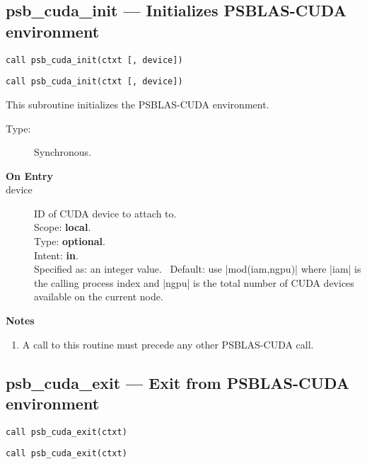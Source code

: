 \subsection*{psb\_cuda\_init --- Initializes PSBLAS-CUDA
  environment}

\ifpdf
\begin{verbatim}
call psb_cuda_init(ctxt [, device])
\end{verbatim}
\else
\begin{center}
    \begin{minipage}[tl]{0.9\textwidth}
\begin{verbatim} 
call psb_cuda_init(ctxt [, device])
\end{verbatim}
    \end{minipage}
  \end{center}
\fi

This subroutine initializes the PSBLAS-CUDA  environment. 
\begin{description}
\item[Type:] Synchronous.
\item[\bf  On Entry ]
\item[device] ID of CUDA device to attach to.\\
Scope: {\bf local}.\\
Type: {\bf optional}.\\
Intent: {\bf in}.\\
Specified as: an integer value. \
Default: use \fortinline|mod(iam,ngpu)| where \fortinline|iam| is the calling
process index and \fortinline|ngpu| is the total number of CUDA devices
available on the current node. 
\end{description}


{\par\noindent\large\bfseries Notes}
\begin{enumerate}
\item A call to this routine must precede any other PSBLAS-CUDA call. 
\end{enumerate}

\subsection*{psb\_cuda\_exit --- Exit from  PSBLAS-CUDA
  environment}

\ifpdf
\begin{verbatim}
call psb_cuda_exit(ctxt)
\end{verbatim}
\else
\begin{center}
    \begin{minipage}[tl]{0.9\textwidth}
\begin{verbatim} 
call psb_cuda_exit(ctxt)
\end{verbatim}
    \end{minipage}
  \end{center}
\fi


